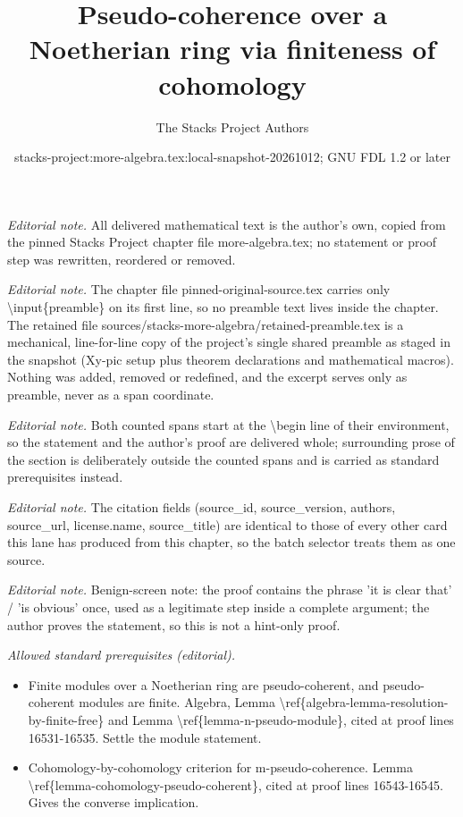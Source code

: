 \documentclass[10pt,a4paper]{amsart}
\title{Pseudo-coherence over a Noetherian ring via finiteness of cohomology}
\author{The Stacks Project Authors}
\date{stacks-project:more-algebra.tex:local-snapshot-20261012; GNU FDL 1.2 or later}
\theoremstyle{plain}
\theoremstyle{definition}
\theoremstyle{remark}
\numberwithin{equation}{subsection}
\begin{document}
\maketitle
\setcounter{subsection}{1}
\noindent\textit{Editorial note.} All delivered mathematical text is the author's own, copied from the pinned Stacks Project chapter file more-algebra.tex; no statement or proof step was rewritten, reordered or removed.\par\medskip
\noindent\textit{Editorial note.} The chapter file pinned-original-source.tex carries only \textbackslash{}input\{preamble\} on its first line, so no preamble text lives inside the chapter. The retained file sources/stacks-more-algebra/retained-preamble.tex is a mechanical, line-for-line copy of the project's single shared preamble as staged in the snapshot (Xy-pic setup plus theorem declarations and mathematical macros). Nothing was added, removed or redefined, and the excerpt serves only as preamble, never as a span coordinate.\par\medskip
\noindent\textit{Editorial note.} Both counted spans start at the \textbackslash{}begin line of their environment, so the statement and the author's proof are delivered whole; surrounding prose of the section is deliberately outside the counted spans and is carried as standard prerequisites instead.\par\medskip
\noindent\textit{Editorial note.} The citation fields (source\_id, source\_version, authors, source\_url, license.name, source\_title) are identical to those of every other card this lane has produced from this chapter, so the batch selector treats them as one source.\par\medskip
\noindent\textit{Editorial note.} Benign-screen note: the proof contains the phrase 'it is clear that' / 'is obvious' once, used as a legitimate step inside a complete argument; the author proves the statement, so this is not a hint-only proof.\par\medskip
\noindent\textit{Allowed standard prerequisites (editorial).}\begin{itemize}
\item Finite modules over a Noetherian ring are pseudo-coherent, and pseudo-coherent modules are finite. Algebra, Lemma \textbackslash{}ref\{algebra-lemma-resolution-by-finite-free\} and Lemma \textbackslash{}ref\{lemma-n-pseudo-module\}, cited at proof lines 16531-16535. Settle the module statement.
\item Cohomology-by-cohomology criterion for m-pseudo-coherence. Lemma \textbackslash{}ref\{lemma-cohomology-pseudo-coherent\}, cited at proof lines 16543-16545. Gives the converse implication.
\end{itemize}\medskip
\end{document}
